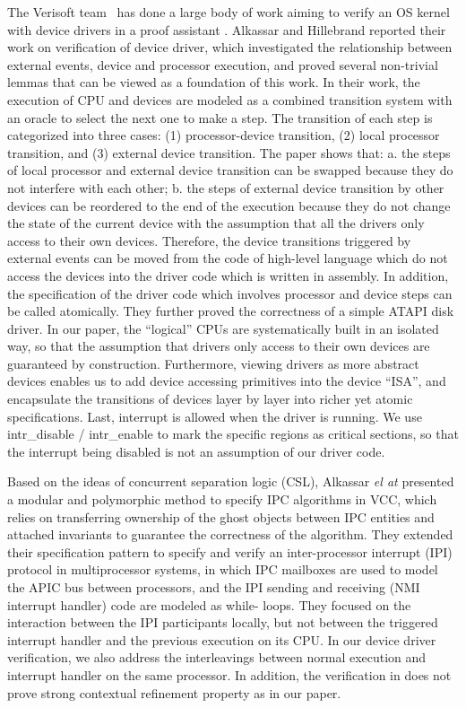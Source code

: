 The Verisoft team~\cite{verisoft07} has done a large body of work
aiming to verify an OS kernel with device drivers in a proof assistant
\cite{Alkassar:OSVE09,Alkassar:VSTTE08-225,Alkassar:VSTTE2010-71}.
Alkassar and Hillebrand \cite{Alkassar:VSTTE08-225} reported
their work on verification of device
driver, which investigated the relationship between external events, device
and processor execution, and proved several non-trivial lemmas that can be
viewed as a foundation of this work. In their work, the execution of CPU and
devices are modeled as a combined transition system with an oracle to select
the next one to make a step. The transition of each step is categorized into
three cases: (1) processor-device transition, (2) local processor transition,
and (3) external device transition. The paper shows that: a. the steps of
local processor and external device transition can be swapped because they do
not interfere with each other; b. the steps of external device transition by
other devices can be reordered to the end of the execution because they do not
change the state of the current device with the assumption that all the
drivers only access to their own devices. Therefore, the device transitions
triggered by external events can be moved from the code of high-level language
which do not access the devices into the driver code which is written in
assembly. In addition, the specification of the driver code which involves
processor and device steps can be called atomically. They further proved the
correctness of a simple ATAPI disk driver.
In our paper, the ``logical'' CPUs are systematically built in an isolated way,
so that the assumption that drivers only access to their own devices are
guaranteed by construction. Furthermore, viewing drivers as more abstract devices
enables us to add device accessing primitives into the device “ISA”, and
encapsulate the transitions of devices layer by layer into richer yet atomic
specifications. Last, interrupt is allowed when the driver is running. We use
\textsf{intr\_disable} / \textsf{intr\_enable} to mark the specific regions
as critical sections,
so that the interrupt being disabled is not an assumption of our driver code.

Based on the ideas of concurrent separation logic (CSL), Alkassar {\em el at}
\cite{Alkassar:IPC}
presented a modular and polymorphic method to specify IPC algorithms in VCC,
which relies on transferring ownership of the ghost objects between IPC
entities and attached invariants to guarantee the correctness of the
algorithm. They extended their specification pattern to specify and verify an
inter-processor interrupt (IPI) protocol in multiprocessor systems, in which
IPC mailboxes are used to model the APIC bus between processors, and the IPI
sending and receiving (NMI interrupt handler) code are modeled as while-
loops. They focused on the interaction between the IPI participants locally,
but not between the triggered interrupt handler and the previous execution on
its CPU. In our device driver verification, we also address the interleavings
between normal execution and interrupt handler on the same processor.
In addition, the verification in \cite{Alkassar:IPC} does not
prove strong contextual refinement property as in our paper.

